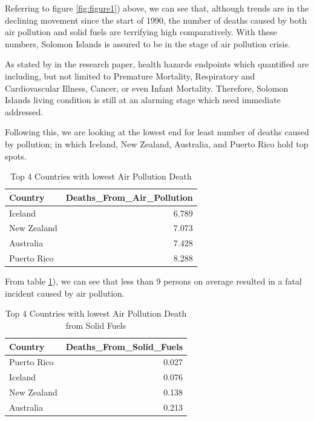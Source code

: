 \documentclass[11pt,a4paper,]{article}
\begin{document}
Referring to figure \ref{fig:figure1}) above, we can see that, although trends are in the declining movement since the start of 1990, the number of deaths caused by both air pollution and solid fuels are terrifying high comparatively. With these numbers, Solomon Islands is assured to be in the stage of air pollution crisis.

As stated by \textcite{hunt2011policy} in the research paper, health hazards endpoints which quantified are including, but not limited to Premature Mortality, Respiratory and Cardiovascular Illness, Cancer, or even Infant Mortality. Therefore, Solomon Islands living condition is still at an alarming stage which need immediate addressed.

Following this, we are looking at the lowest end for least number of deaths caused by pollution; in which Iceland, New Zealand, Australia, and Puerto Rico hold top spots.

\begin{table}[H]

\caption{\label{tab:table1}Top 4 Countries with lowest Air Pollution Death}
\centering
\begin{tabular}[t]{l|r}
\hline
Country & Deaths\_From\_Air\_Pollution\\
\hline
Iceland & 6.789\\
\hline
New Zealand & 7.073\\
\hline
Australia & 7.428\\
\hline
Puerto Rico & 8.288\\
\hline
\end{tabular}
\end{table}

From table \ref{tab:table1}), we can see that less than 9 persons on average resulted in a fatal incident caused by air pollution.

\begin{table}[H]

\caption{\label{tab:table2}Top 4 Countries with lowest Air Pollution Death from Solid Fuels}
\centering
\begin{tabular}[t]{l|r}
\hline
Country & Deaths\_From\_Solid\_Fuels\\
\hline
Puerto Rico & 0.027\\
\hline
Iceland & 0.076\\
\hline
New Zealand & 0.138\\
\hline
Australia & 0.213\\
\hline
\end{tabular}
\end{table}
\end{document}
